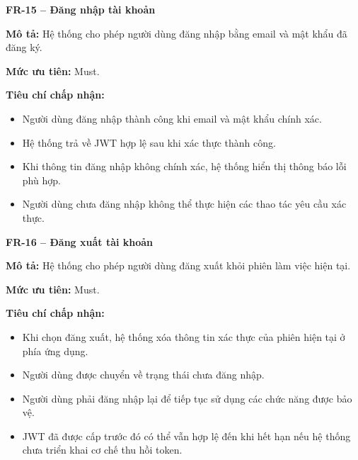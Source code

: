 \documentclass[a4paper]{article}
\begin{document}
\noindent\textbf{FR-15 – Đăng nhập tài khoản}\par\nopagebreak
\begin{list}{}{%
    \setlength{\leftmargin}{0.8cm}%
    \setlength{\rightmargin}{0pt}%
    \setlength{\labelwidth}{0pt}%
    \setlength{\labelsep}{0pt}%
    \setlength{\itemindent}{0pt}%
    \setlength{\listparindent}{0pt}%
    \setlength{\itemsep}{5pt}%
    \setlength{\parsep}{0pt}%
    \setlength{\topsep}{5pt}%
}
\item[] \textbf{Mô tả:} Hệ thống cho phép người dùng đăng nhập bằng email và mật khẩu đã đăng ký.
\item[] \textbf{Mức ưu tiên:} Must.
\item[] \textbf{Tiêu chí chấp nhận:} 
\begin{itemize}
\item Người dùng đăng nhập thành công khi email và mật khẩu chính xác.
\item Hệ thống trả về JWT hợp lệ sau khi xác thực thành công.
\item Khi thông tin đăng nhập không chính xác, hệ thống hiển thị thông báo lỗi phù hợp.
\item Người dùng chưa đăng nhập không thể thực hiện các thao tác yêu cầu xác thực.
\end{itemize}
\end{list}

\par\ifdim\dimexpr\pagegoal-\pagetotal\relax<6\baselineskip\newpage\fi
{}

\noindent\textbf{FR-16 – Đăng xuất tài khoản}\par\nopagebreak
\begin{list}{}{%
    \setlength{\leftmargin}{0.8cm}%
    \setlength{\rightmargin}{0pt}%
    \setlength{\labelwidth}{0pt}%
    \setlength{\labelsep}{0pt}%
    \setlength{\itemindent}{0pt}%
    \setlength{\listparindent}{0pt}%
    \setlength{\itemsep}{5pt}%
    \setlength{\parsep}{0pt}%
    \setlength{\topsep}{5pt}%
}
\item[] \textbf{Mô tả:} Hệ thống cho phép người dùng đăng xuất khỏi phiên làm việc hiện tại.
\item[] \textbf{Mức ưu tiên:} Must.
\item[] \textbf{Tiêu chí chấp nhận:} 
\begin{itemize}
\item Khi chọn đăng xuất, hệ thống xóa thông tin xác thực của phiên hiện tại ở phía ứng dụng.
\item Người dùng được chuyển về trạng thái chưa đăng nhập.
\item Người dùng phải đăng nhập lại để tiếp tục sử dụng các chức năng được bảo vệ.
\item JWT đã được cấp trước đó có thể vẫn hợp lệ đến khi hết hạn nếu hệ thống chưa triển khai cơ chế thu hồi token.
\end{itemize}
\end{list}
\end{document}
